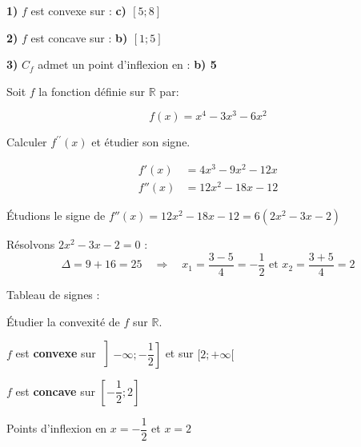 \documentclass[11pt,a4paper]{article}  %
\begin{document}
\begin{corrBox}
	
\textbf{1)} $f$ est convexe sur : \textbf{c) $[5; 8]$}

\textbf{2)} $f$ est concave sur : \textbf{b) $[1; 5]$}

\textbf{3)} $C_f$ admet un point d'inflexion en : \textbf{b) 5}

\end{corrBox}

\exerciceDS{}
Soit $f$ la fonction définie sur $\mathbb{R}$ par:

$$
f(x)=x^{4}-3 x^{3}-6 x^{2}
$$

	\begin{enumMet}
	\item Calculer $f^{\prime \prime}(x)$ et étudier son signe.
	\begin{corrBox}
		\begin{align*}
			f'(x) &= 4x^3 - 9x^2 - 12x \\
			f''(x) &= 12x^2 - 18x - 12
		\end{align*}
		
		Étudions le signe de $f''(x) = 12x^2 - 18x - 12 = 6(2x^2 - 3x - 2)$
		
		Résolvons $2x^2 - 3x - 2 = 0$ :
		$$\Delta = 9 + 16 = 25 \quad \Rightarrow \quad x_1 = \frac{3-5}{4} = -\frac{1}{2} \text{ et } x_2 = \frac{3+5}{4} = 2$$
		
		Tableau de signes :
		\begin{center}
		\end{center}		
	\end{corrBox}
	\item Étudier la convexité de $f$ sur $\mathbb{R}$.
	\begin{corrBox}
		\begin{itemMet}
			\item $f$ est \textbf{convexe} sur $\left]-\infty; -\dfrac{1}{2}\right]$ et sur $[2; +\infty[$
			\item $f$ est \textbf{concave} sur $\left[-\dfrac{1}{2}; 2\right]$
			\item Points d'inflexion en $x = -\dfrac{1}{2}$ et $x = 2$
		\end{itemMet}		
	\end{corrBox}
\end{enumMet}
\end{document}
